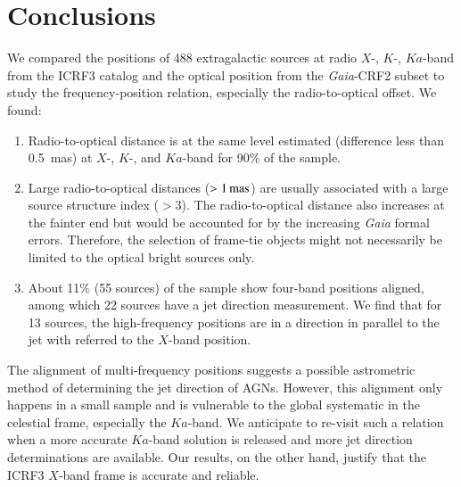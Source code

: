 \documentclass{aa}
\begin{document}

\section{Conclusions} \label{sec:conclusions}

   We compared the positions of 488 extragalactic sources at radio $X$-, $K$-, $Ka$-band from the ICRF3 catalog and the optical position from the \textit{Gaia}-CRF2 subset to study the frequency-position relation, especially the radio-to-optical offset.
   We found:
   \begin{enumerate}
   \item Radio-to-optical distance is at the same level estimated (difference less than 0.5~mas) at $X$-, $K$-, and $Ka$-band for 90\% of the sample.
   \item Large radio-to-optical distances ($>1\,{\rm mas}$) are usually associated with a large source structure index ($>3$).
   The radio-to-optical distance also increases at the fainter end but would be accounted for by the increasing \textit{Gaia} formal errors.
   Therefore, the selection of frame-tie objects might not necessarily be limited to the optical bright sources only.
   \item About 11\% (55 sources) of the sample show four-band positions aligned, among which 22 sources have a jet direction measurement.
   We find that for 13 sources, the high-frequency positions are in a direction in parallel to the jet with referred to the $X$-band position.
   \end{enumerate}

   The alignment of multi-frequency positions suggests a possible astrometric method of determining the jet direction of AGNs.
   However, this alignment only happens in a small sample and is vulnerable to the global systematic in the celestial frame, especially the $Ka$-band.
   We anticipate to re-visit such a relation when a more accurate $Ka$-band solution is released and more jet direction determinations are available.
   Our results, on the other hand, justify that the ICRF3 $X$-band frame is accurate and reliable.

\end{document}
